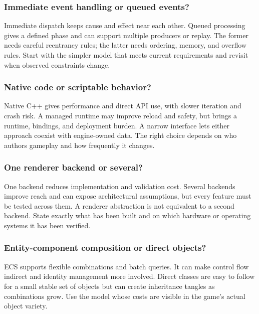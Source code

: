 \subsubsection{Immediate event handling or queued events?}\label{06-engine-ii-ch041-immediate-event-handling-or-queued-events}

Immediate dispatch keeps cause and effect near each other. Queued processing gives a defined phase and can support multiple producers or replay. The former needs careful reentrancy rules; the latter needs ordering, memory, and overflow rules. Start with the simpler model that meets current requirements and revisit when observed constraints change.

\subsubsection{Native code or scriptable behavior?}\label{06-engine-ii-ch041-native-code-or-scriptable-behavior}

Native C++ gives performance and direct API use, with slower iteration and crash risk. A managed runtime may improve reload and safety, but brings a runtime, bindings, and deployment burden. A narrow interface lets either approach coexist with engine-owned data. The right choice depends on who authors gameplay and how frequently it changes.

\subsubsection{One renderer backend or several?}\label{06-engine-ii-ch041-one-renderer-backend-or-several}

One backend reduces implementation and validation cost. Several backends improve reach and can expose architectural assumptions, but every feature must be tested across them. A renderer abstraction is not equivalent to a second backend. State exactly what has been built and on which hardware or operating systems it has been verified.

\subsubsection{Entity-component composition or direct objects?}\label{06-engine-ii-ch041-entity-component-composition-or-direct-objects}

ECS supports flexible combinations and batch queries. It can make control flow indirect and identity management more involved. Direct classes are easy to follow for a small stable set of objects but can create inheritance tangles as combinations grow. Use the model whose costs are visible in the game's actual object variety.

